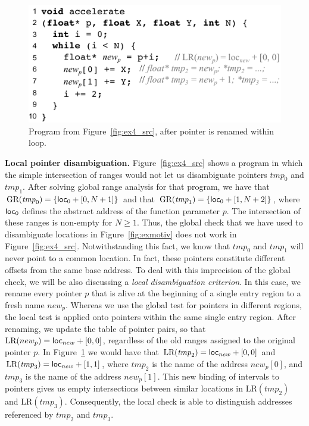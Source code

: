 \documentclass[12pt]{article}
\newcommand\loc[1]{\mbox{\textsf{loc}$_{#1}$}}
\newcommand\gr{\xspace\mbox{GR}\xspace}
\newcommand\lr{\xspace\mbox{LR}\xspace}
\begin{document}
\begin{figure}[t!]
  \centering
\includegraphics{img/ex4_norm}
  \caption{Program from Figure~\ref{fig:ex4_src}, after pointer is renamed
  within loop.}
  \label{fig:ex4_norm}
\end{figure}

\textbf{Local pointer disambiguation. } Figure~\ref{fig:ex4_src} shows
a program in which the simple intersection of ranges would not let us
disambiguate pointers $\mathit{tmp}_0$ and $\mathit{tmp}_1$.  After
solving global range analysis for that program, we have that
$\gr(\mathit{tmp}_0) = \{ \loc{0} + [0, N + 1] \}$ and that
$\gr(\mathit{tmp}_1) = \{ \loc{0} + [1, N + 2] \}$, where $\loc{0}$
defines the abstract address of the function parameter $p$.  The
intersection of these ranges is non-empty for $N \geq 1$.  Thus, the
global check that we have used to disambiguate locations in
Figure~\ref{fig:exmotiv} does not work in Figure~\ref{fig:ex4_src}.
Notwithstanding this fact, we know that $\mathit{tmp}_0$ and
$\mathit{tmp}_1$ will never point to a common location.  In fact,
these pointers constitute different offsets from the same base
address.
To deal with this imprecision of the global check, we will be also discussing
a {\em local disambiguation criterion}.
In this case, we rename every pointer $p$ that is alive at the beginning of
a single entry region to a fresh name $new_{p}$.
Whereas we use the global test for pointers in different regions, the
local test is applied onto pointers within the same single entry region.
After renaming, we update the table of pointer pairs, so that
$\lr(new_p) = \loc{new} + [0, 0]$, regardless of the old ranges assigned to
the original pointer $p$.
In Figure~\ref{fig:ex4_norm} we would have that
$\lr(\mathit{tmp}_2) =  \loc{new} + [0, 0]$  and
$\lr(\mathit{tmp}_3) =  \loc{new} + [1, 1]$, where $\mathit{tmp_2}$ is
the name of the address $\mathit{new}_p[0]$, and
$\mathit{tmp_3}$ is the name of the address $\mathit{new}_p[1]$.
This new binding of intervals to pointers gives us empty
intersections between similar locations in $\lr(tmp_2)$ and $\lr(tmp_3)$.
Consequently, the local check is able to distinguish addresses referenced by
$\mathit{tmp}_2$ and $\mathit{tmp}_3$.
\end{document}
